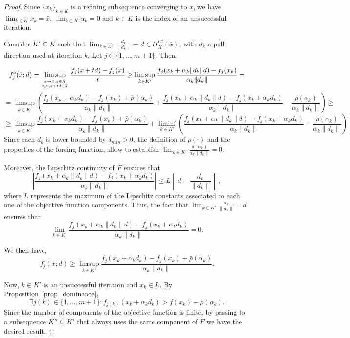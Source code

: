\documentclass[12pt]{article}
\begin{document}
\begin{proof}
Since $\{x_k\}_{k\in K}$ is a refining subsequence converging to
$\bar{x}$, we have $\lim_{k\in K}x_k=\bar{x}$, $\lim_{k\in
K}\alpha_k=0$ and $k\in K$ is the index of an unsuccessful
iteration.

Consider $K'\subseteq K$ such that $\lim_{k\in
K'}\frac{d_k}{\|d_k\|}=d\in H_{\bar{X}}^{Cl}(\bar{x})$, with $d_k$
a poll direction used at iteration $k$. Let
$j\in\{1,\ldots,m+1\}$. Then,

\begin{equation*}
f_{j}^\circ (\bar{x};d) =\limsup_{x\rightarrow \bar{x}, x \in
\bar{X} \atop t \downarrow 0, x+t d \in \bar{X}} \dfrac{f_{j}(x+t
d)-f_{j}(x)}{t}\geq\limsup_{k\in K'}
\dfrac{f_j(x_k+\alpha_k\|d_k\|d)-f_j(x_k)}{\alpha_k\|d_k\|}=
\end{equation*}
\begin{equation*}
=\limsup_{k\in K'}\left( \dfrac{f_j(x_k+\alpha_k
d_k)-f_j(x_k)+\bar{\rho}(\alpha_k)}{\alpha_k\|d_k\|}+
\dfrac{f_j(x_k+\alpha_k \|d_k\|d)-f_j(x_k+\alpha_k
d_k)}{\alpha_k\|d_k\|}-\frac{\bar{\rho}(\alpha_k)}{\alpha_k\|d_k\|}\right)\geq
\end{equation*}
\begin{equation*}
\geq\limsup_{k\in K'} \dfrac{f_j(x_k+\alpha_k
d_k)-f_j(x_k)+\bar{\rho}(\alpha_k)}{\alpha_k\|d_k\|}+\liminf_{k\in
K'}\left( \dfrac{f_j(x_k+\alpha_k \|d_k\|d)-f_j(x_k+\alpha_k
d_k)}{\alpha_k\|d_k\|}-\frac{\bar{\rho}(\alpha_k)}{\alpha_k\|d_k\|}\right)
\end{equation*}
Since each $d_k$ is lower bounded by $d_{min}>0$, the definition
of $\bar{\rho}(\cdot)$ and the properties of the forcing function,
allow to establish $\lim_{k\in
K'}\frac{\bar{\rho}(\alpha_k)}{\alpha_k\|d_k\|}=0$.

Moreover, the Lipschitz continuity of $\bar{F}$ ensures that
$$\left|\dfrac{f_j(x_k+\alpha_k \|d_k\|d)-f_j(x_k+\alpha_k
d_k)}{\alpha_k\|d_k\|}\right|\leq
L\left\|d-\frac{d_k}{\|d_k\|}\right\|,$$ where $L$ represents the
maximum of the Lipschitz constants associated to each one of the
objective function components. Thus, the fact that $\lim_{k\in
K'}\frac{d_k}{\|d_k\|}=d$ ensures that
$$\lim_{k\in K'}\dfrac{f_j(x_k+\alpha_k \|d_k\|d)-f_j(x_k+\alpha_k
d_k)}{\alpha_k\|d_k\|}=0.$$

We then have,
$$f_{j}^\circ (\bar{x};d)\geq \limsup_{k\in K'} \dfrac{f_j(x_k+\alpha_k
d_k)-f_j(x_k)+\bar{\rho}(\alpha_k)}{\alpha_k\|d_k\|}.$$

Now, $k\in K'$ is an unsuccessful iteration and $x_k\in L$. By
Proposition~\ref{prop_dominance},
\begin{equation}\label{ineq}\exists j(k)\in\{1,\ldots,m+1\}:f_{j(k)}(x_k+\alpha_k d_k)>f(x_k)-\bar{\rho}(\alpha_k).\end{equation}
Since the number of components of the objective function is
finite, by passing to a subsequence $K''\subseteq K'$ that always
uses the same component of $\bar{F}$ we have the desired result.
\end{proof}
\end{document}
